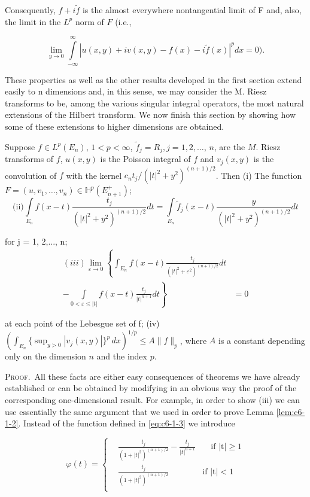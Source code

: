 Consequently, $f + i\tilde{f}$ is the almost everywhere nontangential limit of F and, also, the limit in the $L^{p}$ norm of $F$ (i.e.,

\[
\lim_{y\to0}\int\limits_{-\infty}^{\infty}|u(x,y)+i v(x,y)-f(x)-i\tilde{f}(x)|^{p} dx=0).
\]

These properties as well as the other results developed in the first section extend easily to n dimensions and, in this sense, we may consider the M. Riesz transforms to be, among the various singular integral operators, the most natural extensions of the Hilbert transform. We now finish this section by showing how some of these extensions to higher dimensions are obtained.

\begin{theorem}
\label{thm:c6-4-17}
Suppose $f \in L^p(E_n)$, $1 < p < \infty$, $\tilde{f}_j = R_j, j = 1, 2, \ldots$, $n$, are the $M$. Riesz transforms of $f$, $u(x, y)$ is the Poisson integral of $f$ and $v_j(x, y)$ is the convolution of $f$ with the kernel $c_n t_j / (|t|^2 + y^2)^{(n+1)/2}$. Then
(i) The function $F = (u, v_1, \ldots, v_n) \in \mathbb{H}^p(E_{n+1}^+)$;
\[
\text{(ii)}\int\limits_{E_{n}}f(x-t)\frac{t_{j}}{(|t|^{2}+y^{2})^{(n+1)/2}}d t=\int\limits_{E_{n}}\tilde{f}_{j}(x-t)\frac{y}{(|t|^{2}+y^{2})^{(n+1)/2}}d t
\]

for j = 1, 2,..., n;
\[
\begin{aligned}(iii)\lim_{\varepsilon\to0}\left\{\int_{E_{n}}f(x-t)\frac{t_{j}}{(|t|^{2}+\varepsilon^{2})^{(n+1)/2}}dt\right.\\ \left.-\int\limits_{0<\varepsilon\leq|t|}f(x-t)\frac{t_{j}}{|t|^{n+1}}dt\right\}&=0\end{aligned}
\]

at each point of the Lebesgue set of f;
(iv) $(\int_{E_n} \{\sup_{y>0} |v_j(x, y)|\}^p \, dx)^{1/p} \leq A \|f\|_p$, where $A$ is a constant depending only on the dimension $n$ and the index $p$.
\end{theorem}

\textsc{Proof.}\ All these facts are either easy consequences of theorems we have already established or can be obtained by modifying in an obvious way the proof of the corresponding one-dimensional result. For example, in order to show (iii) we can use essentially the same argument that we used in order to prove Lemma \ref{lem:c6-1-2}. Instead of the function defined in \eqref{eq:c6-1-3} we introduce

\[
\varphi(t)=\left\{\begin{aligned}{}&{{}\frac{t_{j}}{(1+|t|^{2})^{(n+1)/2}}-\frac{t_{j}}{|t|^{n+1}}}&{\quad\mathrm{\text{if } |t| \geq 1 }}\\ {}&{{}\frac{t_{j}}{(1+|t|^{2})^{(n+1)/2}}}&{\mathrm{\text{if } |t| < 1 }}\\ \end{aligned}\right.
\]

